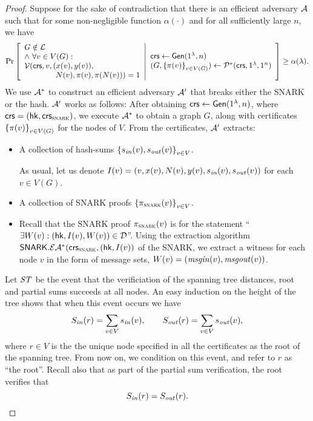 \begin{proof}
Suppose for the sake of contradiction that there is an efficient adversary $\mathcal{A}$ such that for some
non-negligible function $\alpha(\cdot)$
and for all sufficiently large $n$,
we have
\begin{gather*}
    \Pr \left[ \begin{array}{ll} 
    G\notin \mathcal{L} \\
    \wedge\ \forall v\in V(G) : \\
    \mathcal{V}(\mathit{ \mathsf{crs} }, v, (x(v), y(v)),\\
    \qquad\qquad N(v), \pi(v), \pi(N(v))) = 1
     \end{array} \middle\vert \begin{array}{ll} 
    \mathit{ \mathsf{crs} } \leftarrow \mathsf{Gen}(1^\lambda, n) \\
    (G, \left \{{\pi(v) } \right \}_{v\in V(G)}) \leftarrow \mathcal{P}^*(\mathit{ \mathsf{crs} }, 1^\lambda, 1^n)
     \end{array} \right] \geq \alpha(\lambda).
\end{gather*}
We use $\mathcal{A}^*$ to construct an efficient adversary $\mathcal{A}'$ that breaks either the SNARK or the hash.
$\mathcal{A}'$ works as follows:
	After obtaining ${\mathsf{crs}} \leftarrow \mathsf{Gen}(1^\lambda, n)$,
	where $\mathsf{crs} = (\mathsf{hk}, \mathsf{crs}_\textsc{snark})$,
	we execute 
	$\mathcal{A}^*$ to obtain a graph $G$, along with certificates $\left \{{ \pi(v) } \right \}_{v \in V(G)}$
	for the nodes of $V$.
	From the certificates, $\mathcal{A}'$ extracts:
	\begin{itemize}
		\item A collection of hash-sums $\left \{{ s_{\mathit{ in }}(v), s_{\mathit{ out }}(v) } \right \}_{v \in V}$.

			As usual, let us denote $I(v) = (v, x(v), N(v), y(v), s_{\mathit{ in }}(v), s_{\mathit{ out }}(v))$
			for each $v \in V(G)$.
		\item A collection of SNARK proofs $\left \{{ \pi_\textsc{snark}(v) } \right \}_{v \in V}$.
		\item 
			Recall that the SNARK proof $\pi_\textsc{snark}(v)$ is for the statement 
			``$\exists W(v) : (\mathsf{hk}, I(v), W(v)) \in \mathcal{D}$''.
			Using the extraction algorithm
			$\mathsf{SNARK}.\mathcal{E}{\mathcal{A}^*}(\mathsf{crs}_\textsc{snark}, (\mathsf{hk}, I(v))$ of the SNARK,
			we extract a witness for each node $v$
			in the form of message sets,
			$W(v) = (\mathit{ msgin }(v), \mathit{ msgout }(v))$.
	\end{itemize}


	Let $\mathit{ ST }$ be the event that the verificiation of the spanning tree
			distances, root and partial sums succeeds at all nodes.
			An easy induction on the height of the tree
			shows that when this event occurs
			we have
			\begin{equation}
				S_{\mathit{ in }}(r) =
				\sum_{v \in V} s_{\mathit{ in }}(v),
				\qquad
				S_{\mathit{ out }}(r) = \sum_{v \in V} s_{\mathit{ out }}(v),
				\label{cond:partial_sums}
			\end{equation}
		where $r \in V$ is the the unique node specified in all the certificates
		as the root of the spanning tree.
		From now on, we condition on this event,
		and refer to $r$ as ``the root''.
		Recall also that as part of the partial sum verification,
		the root verifies that
		\begin{equation}
			S_{\mathit{ in }}(r) = S_{\mathit{ out }}(r).
			\label{cond:sums_equal}
		\end{equation}



\end{proof}
